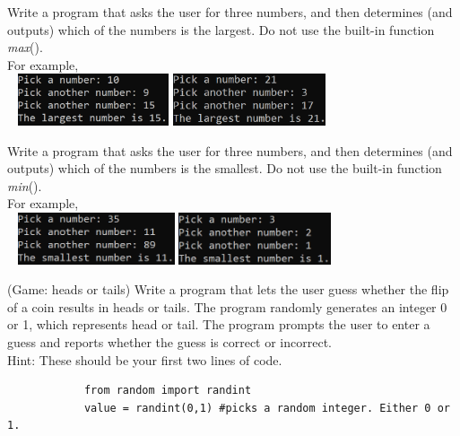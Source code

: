	\item  
		Write a program that asks the user for three numbers, and then determines (and outputs) 
		which of the numbers is the largest.  Do not use the built-in function \textit{max}().\\
		For example, \\ \ \hfill
		\includegraphics[height = 0.6in]{./imgs/largest_ex1.PNG} \hfill
		\includegraphics[height = 0.6in]{./imgs/largest_ex2.PNG} \hfill \ 



	\item  
		Write a program that asks the user for three numbers, and then determines (and outputs)
		which of the numbers is the smallest.  Do not use the built-in function \textit{min}().\\
		For example, \\ \ \hfill
		\includegraphics[height = 0.6in]{./imgs/smallest_ex1.PNG} \hfill
		\includegraphics[height = 0.6in]{./imgs/smallest_ex2.PNG} \hfill \ 




	\item  
		(Game: heads or tails)  Write a program that lets the user guess whether the flip of a coin 
		results in heads or tails.  The program randomly generates an integer 0 or 1, which 
		represents head or tail.  The program prompts the user to enter a guess and reports whether 
		the guess is correct or incorrect.\\
		Hint: These should be your first two lines of code.
		\begin{verbatim}
		    from random import randint
		    value = randint(0,1) #picks a random integer. Either 0 or 1.
		\end{verbatim}




